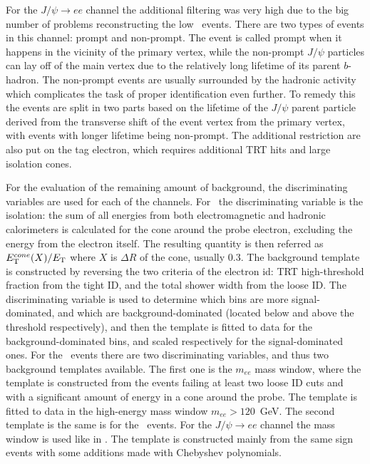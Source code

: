For the $J/\psi \to ee$ channel the additional filtering was very high due to the big number of problems reconstructing the low \et\ events. There are two types of events in this channel: prompt and non-prompt. The event is called prompt when it happens in the vicinity of the primary vertex, while the non-prompt $J/\psi$ particles can lay off of the main vertex due to the relatively long lifetime of its parent $b$-hadron. The non-prompt events are usually surrounded by the hadronic activity which complicates the task of proper identification even further. To remedy this the events are split in two parts based on the lifetime of the $J/\psi$ parent particle derived from the transverse shift of the event vertex from the primary vertex, with events with longer lifetime being non-prompt. The additional restriction are also put on the tag electron, which requires additional TRT hits and large isolation cones.

For the evaluation of the remaining amount of background, the discriminating variables are used for each of the channels. For \Wenu\ the discriminating variable is the isolation: the sum of all energies from both electromagnetic and hadronic calorimeters is calculated for the cone around the probe electron, excluding the energy from the electron itself. The resulting quantity is then referred as $E_{\mathrm{T}}^{cone}(X)/E_{\mathrm{T}}$ where $X$ is $\Delta R$ of the cone, usually $0.3$. The background template is constructed by reversing the two criteria of the electron id: TRT high-threshold fraction from the tight ID, and the total shower width from the loose ID. The discriminating variable is used to determine which bins are more signal-dominated, and which are background-dominated (located below and above the threshold respectively), and then the template is fitted to data for the background-dominated bins, and scaled respectively for the signal-dominated ones. For the \Zee\ events there are two discriminating variables, and thus two background templates available. The first one is the $m_{ee}$ mass window, where the template is constructed from the events failing at least two loose ID cuts and with a significant amount of energy in a cone around the probe. The template is fitted to data in the high-energy mass window $m_{ee} > 120$~GeV. The second template is the same is for the \Wenu\ events. For the $J/\psi \to ee$ channel the mass window is used like in \Zee. The template is constructed mainly from the same sign events with some additions made with Chebyshev polynomials.

